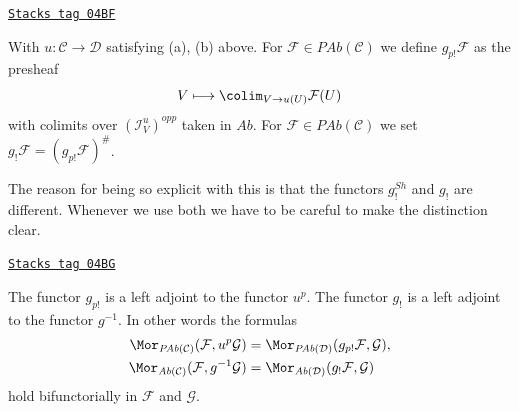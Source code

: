 \begin{definition}[G shriek]
\label{sites-modules-definition-g-shriek}
\href{https://stacks.math.columbia.edu/tag/04BF}{\texttt{Stacks tag 04BF}}

With $u : \mathcal{C} \to \mathcal{D}$ satisfying (a), (b) above.
For $\mathcal{F} \in \textit{PAb}(\mathcal{C})$ we define
{\it $g_{p!}\mathcal{F}$} as the presheaf
$$
V \longmapsto \colim_{V \to u(U)} \mathcal{F}(U)
$$
with colimits over $(\mathcal{I}_V^u)^{opp}$ taken in $\textit{Ab}$. For
$\mathcal{F} \in \textit{PAb}(\mathcal{C})$ we set
{\it $g_!\mathcal{F} = (g_{p!}\mathcal{F})^\#$}.
\end{definition}

The reason for being so explicit with this is that the functors
$g^{Sh}_!$ and $g_!$ are different. Whenever we use both
we have to be careful to make the distinction clear.

\begin{lemma}
\label{sites-modules-lemma-g-shriek-adjoint}
\href{https://stacks.math.columbia.edu/tag/04BG}{\texttt{Stacks tag 04BG}}

The functor $g_{p!}$ is a left adjoint to the functor $u^p$.
The functor $g_!$ is a left adjoint to the functor $g^{-1}$.
In other words the formulas
\begin{align*}
\Mor_{\textit{PAb}(\mathcal{C})}(\mathcal{F}, u^p\mathcal{G})
& =
\Mor_{\textit{PAb}(\mathcal{D})}(g_{p!}\mathcal{F}, \mathcal{G}), \\
\Mor_{\textit{Ab}(\mathcal{C})}(\mathcal{F}, g^{-1}\mathcal{G})
& =
\Mor_{\textit{Ab}(\mathcal{D})}(g_!\mathcal{F}, \mathcal{G})
\end{align*}
hold bifunctorially in $\mathcal{F}$ and $\mathcal{G}$.
\end{lemma}

